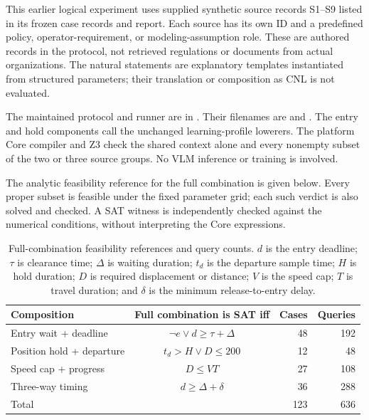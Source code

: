\documentclass[10pt]{article}
\begin{document}
This earlier logical experiment uses supplied synthetic source records S1--S9
listed in its frozen case records and report. Each source
has its own ID and a predefined policy, operator-requirement, or
modeling-assumption role. These are authored records in the protocol, not
retrieved regulations or documents from actual organizations. The natural
statements are explanatory templates instantiated from structured parameters;
their translation or composition as CNL is not evaluated.

\begingroup\raggedright
The maintained protocol and runner are in
.
Their filenames are 
and . The entry and hold
components call the unchanged learning-profile lowerers. The platform Core
compiler and Z3 check the shared context alone and every nonempty subset of
the two or three source groups. No VLM inference or training is involved.
\par\endgroup

The analytic feasibility reference for the full combination is given below.
Every proper subset is feasible under the fixed parameter grid; each such
verdict is also solved and checked. A SAT witness is independently checked
against the numerical conditions, without interpreting the Core expressions.

\begin{table}[h]
\centering\small
\caption{Full-combination feasibility references and query counts. $d$ is
the entry deadline; $\tau$ is clearance time; $\Delta$ is waiting duration;
$t_d$ is the departure sample time; $H$ is hold duration; $D$ is required
displacement or distance; $V$ is the speed cap; $T$ is travel duration; and
$\delta$ is the minimum release-to-entry delay.}
\label{tab:sup-composition-reference}
\begin{tabular}{lcrr}
\toprule
Composition & Full combination is SAT iff & Cases & Queries\\
\midrule
Entry wait + deadline & $\neg e\lor d\ge\tau+\Delta$ & 48 & 192\\
Position hold + departure & $t_d>H\lor D\le200$ & 12 & 48\\
Speed cap + progress & $D\le VT$ & 27 & 108\\
Three-way timing & $d\ge\Delta+\delta$ & 36 & 288\\
\midrule
Total & & 123 & 636\\
\bottomrule
\end{tabular}
\end{table}
\end{document}
